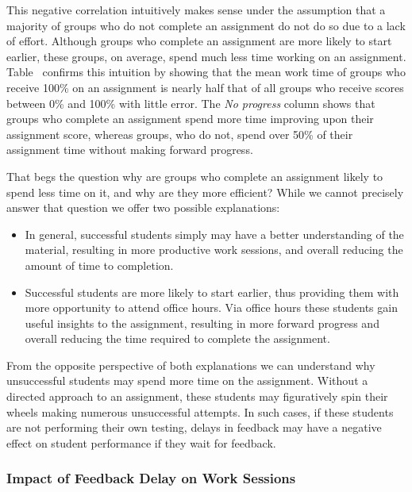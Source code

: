 This negative correlation intuitively makes sense under the assumption that a
majority of groups who do not complete an assignment do not do so due to a lack
of effort. Although groups who complete an assignment are more likely to start
earlier, these groups, on average, spend much less time working on an
assignment. Table~ confirms this intuition by showing
that the mean work time of groups who receive 100\% on an assignment is nearly
half that of all groups who receive scores between 0\% and 100\% with little
error. The \emph{No progress} column shows that groups who complete an
assignment spend more time improving upon their assignment score, whereas
groups, who do not, spend over 50\% of their assignment time without making
forward progress.

That begs the question why are groups who complete an assignment likely to
spend less time on it, and why are they more efficient? While we cannot
precisely answer that question we offer two possible explanations:

\begin{itemize}
\item In general, successful students simply may have a better understanding of
  the material, resulting in more productive work sessions, and overall
  reducing the amount of time to completion.
\item Successful students are more likely to start earlier, thus providing them
  with more opportunity to attend office hours. Via office hours these students
  gain useful insights to the assignment, resulting in more forward progress
  and overall reducing the time required to complete the assignment.
\end{itemize}

From the opposite perspective of both explanations we can understand why
unsuccessful students may spend more time on the assignment. Without a directed
approach to an assignment, these students may figuratively spin their wheels
making numerous unsuccessful attempts. In such cases, if these students are not
performing their own testing, delays in feedback may have a negative effect on
student performance if they wait for feedback.


\subsubsection{Impact of Feedback Delay on Work Sessions}

